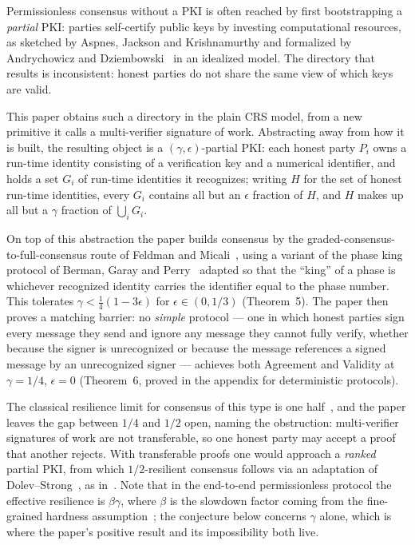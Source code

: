 \documentclass{conjura-conjecture}
\begin{document}
Permissionless consensus without a PKI is often reached by first
bootstrapping a \emph{partial} PKI: parties self-certify public keys by
investing computational resources, as sketched by Aspnes, Jackson and
Krishnamurthy and formalized by Andrychowicz and
Dziembowski~\cite{AD15} in an idealized model. The directory that
results is inconsistent: honest parties do not share the same view of
which keys are valid.

This paper obtains such a directory in the plain CRS model, from a new
primitive it calls a multi-verifier signature of work. Abstracting away
from how it is built, the resulting object is a
$(\gamma,\epsilon)$-partial PKI: each honest party $P_i$ owns a run-time
identity consisting of a verification key and a numerical identifier,
and holds a set $G_i$ of run-time identities it recognizes; writing $H$
for the set of honest run-time identities, every $G_i$ contains all but
an $\epsilon$ fraction of $H$, and $H$ makes up all but a $\gamma$
fraction of $\bigcup_i G_i$.

On top of this abstraction the paper builds consensus by the
graded-consensus-to-full-consensus route of Feldman and
Micali~\cite{FM97}, using a variant of the phase king protocol of
Berman, Garay and Perry~\cite{BGP89} adapted so that the ``king'' of a
phase is whichever recognized identity carries the identifier equal to
the phase number. This tolerates $\gamma < \frac{1}{4}(1-3\epsilon)$ for
$\epsilon \in (0,1/3)$ (Theorem~5). The paper then proves a matching
barrier: no \emph{simple} protocol --- one in which honest parties sign
every message they send and ignore any message they cannot fully verify,
whether because the signer is unrecognized or because the message
references a signed message by an unrecognized signer --- achieves both
Agreement and Validity at $\gamma = 1/4$, $\epsilon = 0$ (Theorem~6,
proved in the appendix for deterministic protocols).

The classical resilience limit for consensus of this type is one
half~\cite{Fit02}, and the paper leaves the gap between $1/4$ and $1/2$
open, naming the obstruction: multi-verifier signatures of work are not
transferable, so one honest party may accept a proof that another
rejects. With transferable proofs one would approach a \emph{ranked}
partial PKI, from which $1/2$-resilient consensus follows via an
adaptation of Dolev--Strong~\cite{DS83}, as in~\cite{AD15}. Note that in
the end-to-end permissionless protocol the effective resilience is
$\beta\gamma$, where $\beta$ is the slowdown factor coming from the
fine-grained hardness assumption~\cite{BGH24a}; the conjecture below
concerns $\gamma$ alone, which is where the paper's positive result and
its impossibility both live.
\end{document}
